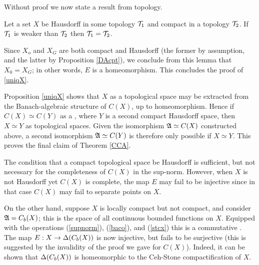 Without proof we now state a result from topology.
\begin{Lemma}
Let a set $X$ be Hausdorff in some topology ${\cal T}_1$ and compact in a
topology ${\cal T}_2$. If ${\cal T}_1$ is weaker than ${\cal T}_2$ then
${\cal T}_1={\cal T}_2$. \end{Lemma}

Since $X_o$ and $X_G$ are both compact and Hausdorff (the former by
assumption, and the latter by Proposition \ref{DAcpt}), we conclude
from this lemma that $X_0=X_G$; in other words, $E$ is a
homeomorphism. This concludes the proof of \ref{uniqX}.\enp

Proposition \ref{uniqX} shows that $X$ as a topological space may be
extracted from the Banach-algebraic structure of $C(X)$, up to
homeomorphism. Hence if $C(X)\simeq C(Y)$ as a \ca, where $Y$ is a
second compact Hausdorff space, then $X\simeq Y$ as topological
spaces. Given the isomorphism ${\frak A}\simeq C(X)$ constructed above, a
second isomorphism ${\frak A}\simeq C(Y)$ is therefore only possible if
$X\simeq Y$. This proves the final claim of Theorem \ref{CCA}.\enp

The condition that a compact topological space be Hausdorff is
sufficient, but not necessary for the completeness of $C(X)$ in the
sup-norm. However, when $X$ is not Hausdorff yet $C(X)$ is complete,
the map $E$ may fail to be injective since in that case $C(X)$ may
fail to separate points on $X$.

On the other hand, suppose $X$ is locally compact but not compact, and
consider ${\frak A}=C_b(X)$; this is the space of all continuous bounded
functions on $X$. Equipped with the operations (\ref{supnorm}),
(\ref{baco}), and (\ref{stcx}) this is a commutative \ca. The map
$E:X\rightarrow \Delta(C_b(X))$ is now injective, but fails to be surjective
(this is suggested by the invalidity of the proof we gave for
$C(X)$). Indeed, it can be shown that $\Delta(C_b(X))$ is homeomorphic to
the Ceh-Stone compactification of $X$.

